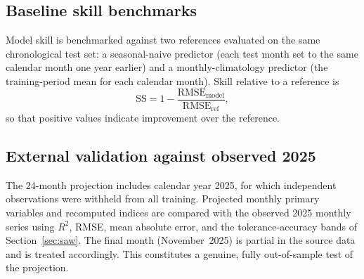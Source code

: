 \documentclass[review,11pt]{elsarticle}
\begin{document}
\subsection{Baseline skill benchmarks}\label{sec:baselines}
Model skill is benchmarked against two references evaluated on the same
chronological test set: a seasonal-naive predictor (each test month set to the
same calendar month one year earlier) and a monthly-climatology predictor (the
training-period mean for each calendar month). Skill relative to a reference is
\begin{equation}
\mathrm{SS}=1-\frac{\mathrm{RMSE}_{\text{model}}}{\mathrm{RMSE}_{\text{ref}}},
\label{eq:skill}
\end{equation}
so that positive values indicate improvement over the reference.

\subsection{External validation against observed 2025}\label{sec:validation}
The 24-month projection includes calendar year 2025, for which independent
observations were withheld from all training. Projected monthly primary
variables and recomputed indices are compared with the observed 2025 monthly
series using $R^{2}$, RMSE, mean absolute error, and the tolerance-accuracy
bands of Section~\ref{sec:saw}. The final month (November~2025) is partial in the
source data and is treated accordingly. This constitutes a genuine, fully
out-of-sample test of the projection.
\end{document}
